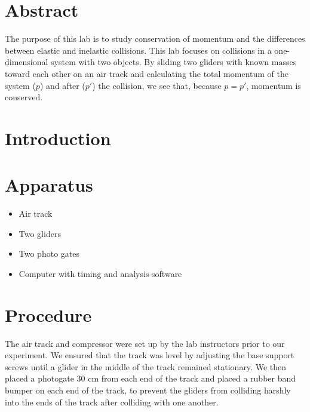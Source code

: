 \documentclass[12pt,letterpaper,titlepage]{report}
\begin{document}



\section*{Abstract}

\noindent
The purpose of this lab is to study conservation of momentum and the 
differences between elastic and inelastic collisions. This lab focuses on
collisions in a one-dimensional system with two objects. By sliding two
gliders with known masses toward each other on an air track and calculating
the total momentum of the system ($p$) and after ($p'$) the collision, we see
that, because $p = p'$, momentum is conserved.


\section*{Introduction}

\noindent



\section*{Apparatus}

\begin{itemize}
    \item Air track
    \item Two gliders
    \item Two photo gates
    \item Computer with timing and analysis software
\end{itemize}


\section*{Procedure}

\noindent
The air track and compressor were set up by the lab instructors prior to
our experiment. We ensured that the track was level by adjusting the base
support screws until a glider in the middle of the track remained stationary.
We then placed a photogate 30 cm from each end of the track and placed a 
rubber band bumper on each end of the track, to prevent the gliders from
colliding harshly into the ends of the track after colliding with one another.
\end{document}
